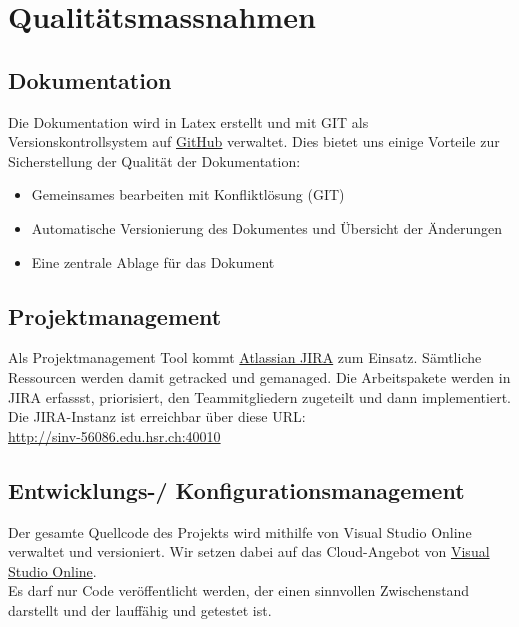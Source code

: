 \chapter{Qualitätsmassnahmen}

\section{Dokumentation}
Die Dokumentation wird in Latex erstellt und mit GIT als Versionskontrollsystem auf \href{https:www.//github.com}{GitHub} verwaltet. Dies bietet uns einige Vorteile zur Sicherstellung der Qualität der Dokumentation:
\\\begin{itemize}
    \item Gemeinsames bearbeiten mit Konfliktlösung (GIT)
    \item Automatische Versionierung des Dokumentes und Übersicht der Änderungen
    \item Eine zentrale Ablage für das Dokument
\end{itemize}


\section{Projektmanagement}
Als Projektmanagement Tool kommt \href{https://www.atlassian.com/software/jira/agile}{Atlassian JIRA} zum Einsatz. Sämtliche Ressourcen werden damit 
getracked und gemanaged. Die Arbeitspakete werden in JIRA erfassst, priorisiert, den Teammitgliedern zugeteilt und dann implementiert. 
Die JIRA-Instanz ist erreichbar über diese URL: 
\\\url{http://sinv-56086.edu.hsr.ch:40010}

\section{Entwicklungs-/ Konfigurationsmanagement}
Der gesamte Quellcode des Projekts wird mithilfe von Visual Studio Online verwaltet und versioniert. Wir setzen dabei auf das Cloud-Angebot von \href{http://www.visualstudio.com/}{Visual Studio Online}. 
\\Es darf nur Code veröffentlicht werden, der einen sinnvollen Zwischenstand darstellt und der lauffähig und getestet ist.
\newpage

